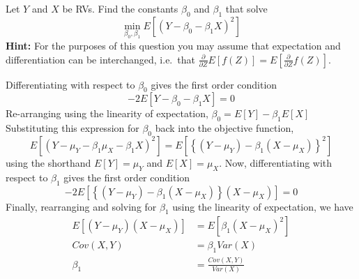 \documentclass[addpoints,12pt]{exam}\usepackage[]{graphicx}\usepackage[]{color}
\begin{document}
\begin{questions}


\question Let $Y$ and $X$ be RVs. Find the constants $\beta_0$ and $\beta_1$ that solve  
\[
  \min_{\beta_0, \beta_1} E[(Y - \beta_0 - \beta_1 X)^2]
\]
\textbf{Hint:} For the purposes of this question you may assume that expectation and differentiation can be interchanged, i.e.\ that $\frac{\partial}{\partial Z} E[f(Z)] = E[\frac{\partial}{\partial Z} f(Z)]$.
\begin{solution}
  Differentiating with respect to $\beta_0$ gives the first order condition
  \[
    -2 E[Y - \beta_0 - \beta_1 X] = 0
    \]
  Re-arranging using the linearity of expectation, $\beta_0 = E[Y] - \beta_1 E[X]$
  Substituting this expression for $\beta_0$ back into the objective function, 
  \[
    E[(Y - \mu_Y - \beta_1 \mu_X - \beta_1 X)^2] = E\left[ \left\{ (Y-\mu_Y) - \beta_1 (X - \mu_X)\right\}^2\right]
  \]
  using the shorthand $E[Y] = \mu_Y$ and $E[X] = \mu_X$.
  Now, differentiating with respect to $\beta_1$ gives the first order condition
  \[
    -2 E\left[ \left\{(Y - \mu_Y) - \beta_1(X - \mu_X)\right\} (X - \mu_X)\right] = 0
    \]
 Finally, rearranging and solving for $\beta_1$ using the linearity of expectation, we have
 \begin{align*}
    E[(Y - \mu_Y)(X - \mu_X)] &=  E[\beta_1(X - \mu_X)^2]\\
    Cov(X,Y) &=  \beta_1 Var(X)\\
    \beta_1 &= \frac{Cov(X,Y)}{Var(X)}
 \end{align*}
\end{solution}


\end{questions}
\end{document}
